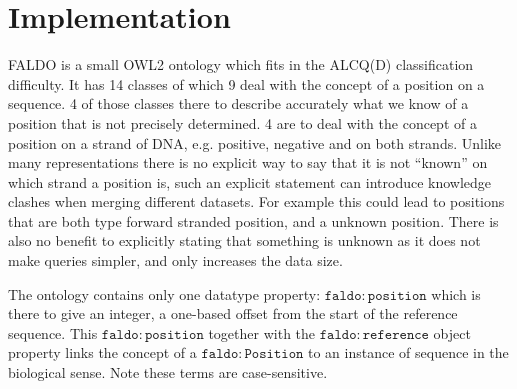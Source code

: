 \section*{Implementation}

FALDO is a small OWL2 ontology which fits in the ALCQ(D) classification difficulty.
It has 14 classes of which 9 deal with the concept of a position on a sequence. 
4 of those classes there to describe accurately what we know of a position that is not precisely determined. 
4 are to deal with the concept of a position on a strand of DNA, e.g. positive, negative and on both strands.
Unlike many representations there is no explicit way to say that it is not ``known'' on which strand a position is,
such an explicit statement can introduce knowledge clashes when merging different datasets.
For example this could lead to positions that are both type forward stranded position, and a unknown position.
There is also no benefit to explicitly stating that something is unknown as it does not make queries simpler,
and only increases the data size.

The ontology contains only one datatype property: $\mathtt{faldo\colon{}position}$ which is there to give an integer,
a one-based offset from the start of the reference sequence.
This $\mathtt{faldo\colon{}position}$ together with the $\mathtt{faldo\colon{}reference}$ object property links the concept
of a $\mathtt{faldo\colon{}Position}$ to an instance of sequence in the biological sense.
Note these terms are case-sensitive.

